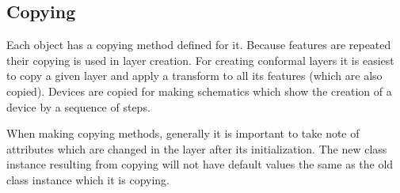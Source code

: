 \documentclass{article}
\begin{document}
\subsection{Copying} 
Each object has a copying method defined for it. Because features are repeated their copying is used in layer creation. For creating conformal layers it is easiest to copy a given layer and apply a transform to all its features (which are also copied). Devices are copied for making schematics which show the creation of a device by a sequence of steps.

When making copying methods, generally it is important to take note of attributes which are changed in the layer after its initialization. The new class instance resulting from copying will not have default values the same as the old class instance which it is copying.

\end{document}
